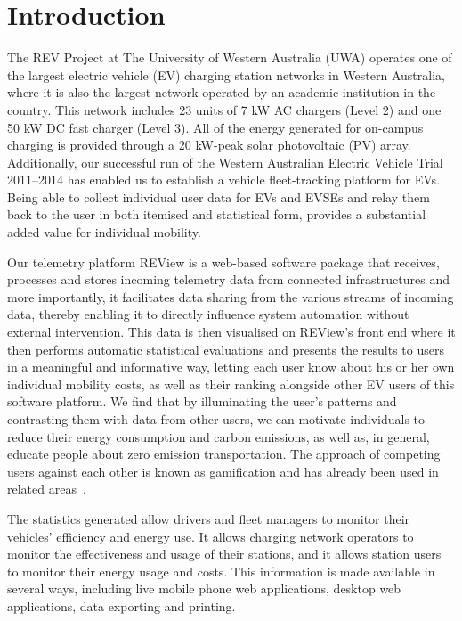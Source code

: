 \section{Introduction}
\label{sec:9:intro}
The REV Project at The University of Western Australia (UWA) operates one of the largest electric vehicle (EV) charging station networks in Western Australia, where it is also the largest network operated by an academic institution in the country. This network includes 23 units of 7 kW AC chargers (Level 2) and one 50 kW DC fast charger (Level 3). All of the energy generated for on-campus charging is provided through a 20 kW-peak solar photovoltaic (PV) array. Additionally, our successful run of the Western Australian Electric Vehicle Trial 2011--2014 has enabled us to establish a vehicle fleet-tracking platform for EVs. Being able to collect individual user data for EVs and EVSEs and relay them back to the user in both itemised and statistical form, provides a substantial added value for individual mobility.


Our telemetry platform REView is a web-based software package that receives, processes and stores incoming telemetry data from connected infrastructures and more importantly, it facilitates data sharing from the various streams of incoming data, thereby enabling it to directly influence system automation without external intervention. This data is then visualised on REView’s front end where it then performs automatic statistical evaluations and presents the results to users in a meaningful and informative way, letting each user know about his or her own individual mobility costs, as well as their ranking alongside other EV users of this software platform. We find that by illuminating the user’s patterns and contrasting them with data from other users, we can motivate individuals to reduce their energy consumption and carbon emissions, as well as, in general, educate people about zero emission transportation. The approach of competing users against each other is known as gamification and has already been used in related areas~\cite{magana_gafu:_2015}.

The statistics generated allow drivers and fleet managers to monitor their vehicles’ efficiency and energy use. It allows charging network operators to monitor the effectiveness and usage of their stations, and it allows station users to monitor their energy usage and costs. This information is made available in several ways, including live mobile phone web applications, desktop web applications, data exporting and printing.  

